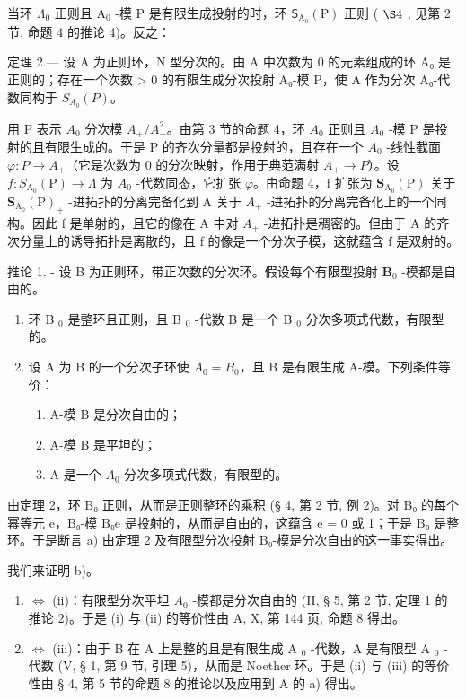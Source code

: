 当环 \(\Lambda_0\) 正则且 \(\mathrm{A}_0\) -模 P 是有限生成投射的时，环 \(\mathsf{S}_{\mathrm{A}_0}(\mathrm{P})\) 正则 ( \(\S 4\) , 见第 2 节, 命题 4 的推论 4)。反之：

定理 2.--- 设 A 为正则环，N 型分次的。由 A 中次数为 0 的元素组成的环 A₀ 是正则的；存在一个次数 \textgreater{} 0 的有限生成分次投射 A₀-模 P，使 A 作为分次 A₀-代数同构于 \(S_{A_{0}}(P)\)。

用 P 表示 \(A_{0}\) 分次模 \(A_{+}/A_{+}^{2}\)。由第 3 节的命题 4，环 \(A_{0}\) 正则且 \(A_{0}\) -模 P 是投射的且有限生成的。于是 P 的齐次分量都是投射的，且存在一个 \(A_{0}\) -线性截面 \(\varphi: P \to A_{+}\)（它是次数为 0 的分次映射，作用于典范满射 \(A_{+} \to P\)）。设 \(f: S_{\mathrm{A}_{0}}(\mathrm{P}) \longrightarrow \Lambda\) 为 \(A_{0}\) -代数同态，它扩张 \(\varphi\)。由命题 4，f 扩张为 \(\mathbf{S}_{\mathrm{A}_{0}}(\mathrm{P})\) 关于 \(\mathbf{S}_{\mathrm{A}_{0}}(\mathrm{P})_{+}\) -进拓扑的分离完备化到 A 关于 \(A_{+}\) -进拓扑的分离完备化上的一个同构。因此 f 是单射的，且它的像在 A 中对 \(A_{+}\) -进拓扑是稠密的。但由于 A 的齐次分量上的诱导拓扑是离散的，且 f 的像是一个分次子模，这就蕴含 f 是双射的。

推论 1. - 设 B 为正则环，带正次数的分次环。假设每个有限型投射 \(\mathbf{B}_0\) -模都是自由的。

\begin{enumerate}
\def\labelenumi{\alph{enumi})}
\item
  环 B \(_{0}\) 是整环且正则，且 B \(_{0}\) -代数 B 是一个 B \(_{0}\) 分次多项式代数，有限型的。
\item
  设 A 为 B 的一个分次子环使 \(A_{0} = B_{0}\)，且 B 是有限生成 A-模。下列条件等价：
  \begin{enumerate}
  \def\labelenumii{(\roman{enumii})}
  \item
    A-模 B 是分次自由的；
  \item
    A-模 B 是平坦的；
  \item
    A 是一个 \(A_{0}\) 分次多项式代数，有限型的。
  \end{enumerate}
\end{enumerate}

由定理 2，环 B₀ 正则，从而是正则整环的乘积 (§ 4, 第 2 节, 例 2)。对 B₀ 的每个幂等元 e，B₀-模 B₀e 是投射的，从而是自由的，这蕴含 e = 0 或 1；于是 B₀ 是整环。于是断言 a) 由定理 2 及有限型分次投射 B₀-模是分次自由的这一事实得出。

我们来证明 b)。

\begin{enumerate}
\def\labelenumi{(\roman{enumi})}
\item
  \(\Leftrightarrow\) (ii)：有限型分次平坦 \(A_0\) -模都是分次自由的 (II, § 5, 第 2 节, 定理 1 的推论 2)。于是 (i) 与 (ii) 的等价性由 A, X, 第 144 页, 命题 8 得出。
\item
  \(\Leftrightarrow\) (iii)：由于 B 在 A 上是整的且是有限生成 A \(_0\) -代数，A 是有限型 A \(_0\) -代数 (V, § 1, 第 9 节, 引理 5)，从而是 Noether 环。于是 (ii) 与 (iii) 的等价性由 § 4, 第 5 节的命题 8 的推论以及应用到 A 的 a) 得出。
\end{enumerate}

